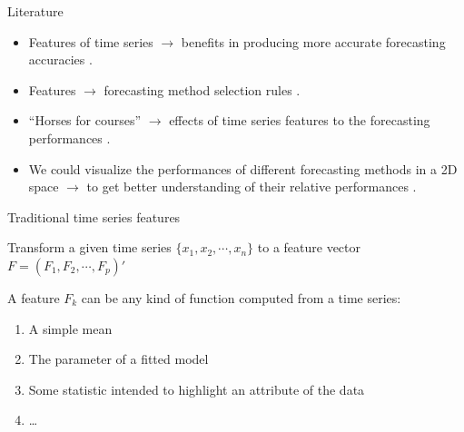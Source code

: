 \documentclass[10pt,aspectratio=43]{beamer}
\begin{document}
\begin{frame}{Literature}

  \begin{itemize}
  \item Features of time series \(\rightarrow\) benefits in producing more accurate
    forecasting accuracies \citep{adam1973individual}.

  \item Features \(\rightarrow\) forecasting method selection rules
    \citep{meade2000evidence}.

  \item ``Horses for courses'' \(\rightarrow\) effects of time series features to the
    forecasting performances \citep{Petropoulos2014}.

  \item We could visualize the performances of different forecasting methods in a 2D space
    \(\rightarrow\) to get better understanding of their relative performances
    \citep{kang2017visualising}.

  \end{itemize}

\end{frame}

\begin{frame}{Traditional time series features}

  Transform a given time series \(\{x_1, x_2, \cdots, x_n\}\) to a feature
  vector \(F = (F_1, F_2, \cdots, F_p)'\) \citep{kang2017visualising,cikm2015}

  \begin{block}{A feature \(F_k\) can be any kind of function computed
      from a time series:}

    \begin{enumerate}
    \item
      A simple mean
    \item
      The parameter of a fitted model
    \item
      Some statistic intended to highlight an attribute of the data
    \item
      \ldots{}
    \end{enumerate}

  \end{block}

\end{frame}
\end{document}
